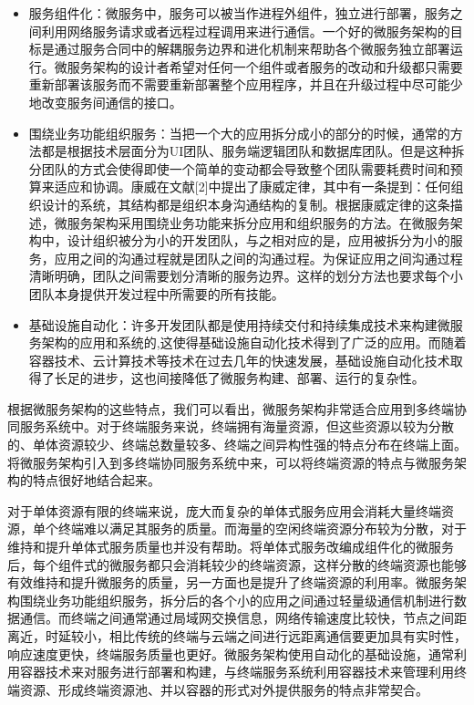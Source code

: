 \begin{itemize}
    \item 服务组件化：微服务中，服务可以被当作进程外组件，独立进行部署，服务之间利用网络服务请求或者远程过程调用来进行通信。一个好的微服务架构的目标是通过服务合同中的解耦服务边界和进化机制来帮助各个微服务独立部署运行。微服务架构的设计者希望对任何一个组件或者服务的改动和升级都只需要重新部署该服务而不需要重新部署整个应用程序，并且在升级过程中尽可能少地改变服务间通信的接口。
    \item 围绕业务功能组织服务：当把一个大的应用拆分成小的部分的时候，通常的方法都是根据技术层面分为UI团队、服务端逻辑团队和数据库团队。但是这种拆分团队的方式会使得即使一个简单的变动都会导致整个团队需要耗费时间和预算来适应和协调。康威在文献[2]中提出了康威定律，其中有一条提到：任何组织设计的系统，其结构都是组织本身沟通结构的复制。根据康威定律的这条描述，微服务架构采用围绕业务功能来拆分应用和组织服务的方法。在微服务架构中，设计组织被分为小的开发团队，与之相对应的是，应用被拆分为小的服务，应用之间的沟通过程就是团队之间的沟通过程。为保证应用之间沟通过程清晰明确，团队之间需要划分清晰的服务边界。这样的划分方法也要求每个小团队本身提供开发过程中所需要的所有技能。
    \item 基础设施自动化：许多开发团队都是使用持续交付和持续集成技术来构建微服务架构的应用和系统的,这使得基础设施自动化技术得到了广泛的应用。而随着容器技术、云计算技术等技术在过去几年的快速发展，基础设施自动化技术取得了长足的进步，这也间接降低了微服务构建、部署、运行的复杂性。

\end{itemize}

根据微服务架构的这些特点，我们可以看出，微服务架构非常适合应用到多终端协同服务系统中。对于终端服务来说，终端拥有海量资源，但这些资源以较为分散的、单体资源较少、终端总数量较多、终端之间异构性强的特点分布在终端上面。将微服务架构引入到多终端协同服务系统中来，可以将终端资源的特点与微服务架构的特点很好地结合起来。

对于单体资源有限的终端来说，庞大而复杂的单体式服务应用会消耗大量终端资源，单个终端难以满足其服务的质量。而海量的空闲终端资源分布较为分散，对于维持和提升单体式服务质量也并没有帮助。将单体式服务改编成组件化的微服务后，每个组件式的微服务都只会消耗较少的终端资源，这样分散的终端资源也能够有效维持和提升微服务的质量，另一方面也是提升了终端资源的利用率。微服务架构围绕业务功能组织服务，拆分后的各个小的应用之间通过轻量级通信机制进行数据通信。而终端之间通常通过局域网交换信息，网络传输速度比较快，节点之间距离近，时延较小，相比传统的终端与云端之间进行远距离通信要更加具有实时性，响应速度更快，终端服务质量也更好。微服务架构使用自动化的基础设施，通常利用容器技术来对服务进行部署和构建，与终端服务系统利用容器技术来管理利用终端资源、形成终端资源池、并以容器的形式对外提供服务的特点非常契合。

